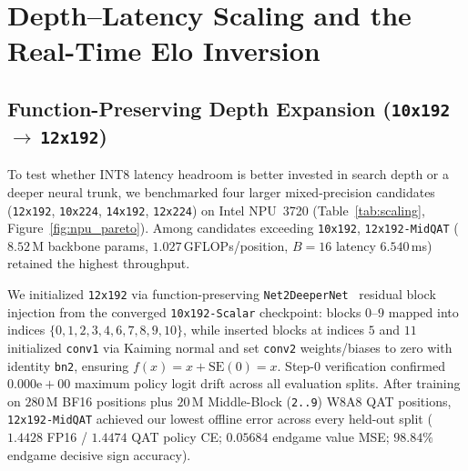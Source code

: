 \documentclass[10pt,twocolumn]{article}
\begin{document}
\section{Depth--Latency Scaling and the Real-Time Elo Inversion}
\label{sec:scaling}

\subsection{Function-Preserving Depth Expansion (\texttt{10x192}\,$\to$\,\texttt{12x192})}
To test whether INT8 latency headroom is better invested in search depth or a deeper neural trunk, we benchmarked four larger mixed-precision candidates (\texttt{12x192}, \texttt{10x224}, \texttt{14x192}, \texttt{12x224}) on Intel NPU~3720 (Table~\ref{tab:scaling}, Figure~\ref{fig:npu_pareto}). Among candidates exceeding \texttt{10x192}, \texttt{12x192-MidQAT} ($8.52$\,M backbone params, $1.027$\,GFLOPs/position, $B=16$ latency $6.540$\,ms) retained the highest throughput.

We initialized \texttt{12x192} via function-preserving \texttt{Net2DeeperNet}~\cite{chen2016net2net} residual block injection from the converged \texttt{10x192-Scalar} checkpoint: blocks $0\text{--}9$ mapped into indices $\{0,1,2,3,4,6,7,8,9,10\}$, while inserted blocks at indices $5$ and $11$ initialized \texttt{conv1} via Kaiming normal and set \texttt{conv2} weights/biases to zero with identity \texttt{bn2}, ensuring $f(x) = x + \mathrm{SE}(0) = x$. Step-0 verification confirmed $0.000\text{e}{+}00$ maximum policy logit drift across all evaluation splits. After training on $280$\,M BF16 positions plus $20$\,M Middle-Block (\texttt{2..9}) W8A8 QAT positions, \texttt{12x192-MidQAT} achieved our lowest offline error across every held-out split ($1.4428$ FP16 / $1.4474$ QAT policy CE; $0.05684$ endgame value MSE; $98.84\%$ endgame decisive sign accuracy).
\end{document}
